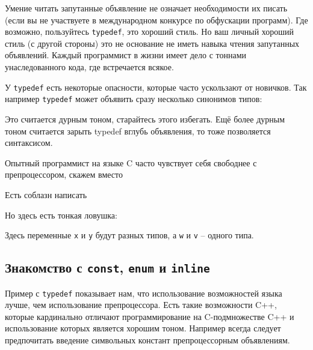 \documentclass[a4paper,12pt,oneside]{article}
\begin{document}


Умение читать запутанные объявление не означает необходимости их писать (если вы не участвуете в международном конкурсе по обфускации программ). Где возможно, пользуйтесь \lstinline!typedef!, это хороший стиль. Но ваш личный хороший стиль (с другой стороны) это не основание не иметь навыка чтения запутанных объявлений. Каждый программист в жизни имеет дело с тоннами унаследованного кода, где встречается всякое.

У \lstinline!typedef! есть некоторые опасности, которые часто ускользают от новичков. Так например \lstinline!typedef! может объявить сразу несколько синонимов типов:



Это считается дурным тоном, старайтесь этого избегать. Ещё более дурным тоном считается зарыть typedef вглубь объявления, то тоже позволяется синтаксисом.



Опытный программист на языке C часто чувствует себя свободнее с препроцессором, скажем вместо



Есть соблазн написать



Но здесь есть тонкая ловушка:



Здесь переменные \lstinline!x! и \lstinline!y! будут разных типов, а \lstinline!w! и \lstinline!v! – одного типа.

\subsection{Знакомство с \lstinline!const!, \lstinline!enum! и \lstinline!inline!}\label{ConstVsDef}

Пример с \lstinline!typedef! показывает нам, что использование возможностей языка лучше, чем использование препроцессора. Есть такие возможности C++, которые кардинально отличают программирование на C-подмножестве C++ и использование которых является хорошим тоном. Например всегда следует предпочитать введение символьных констант препроцессорным объявлениям.
\end{document}
